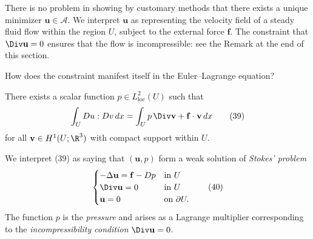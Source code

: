 There is no problem in showing by customary methods that there exists a unique minimizer $\mathbf{u} \in \mathcal{A}$. We interpret $\mathbf{u}$ as representing the velocity field of a steady fluid flow within the region $U$, subject to the external force $\mathbf{f}$. The constraint that $\Div \mathbf{u} = 0$ ensures that the flow is incompressible: see the Remark at the end of this section.

How does the constraint manifest itself in the Euler--Lagrange equation?

\begin{theorem}
\label{thm:pressure-lagrange-multiplier-stokes}
There exists a scalar function $p \in L^2_{\text{loc}}(U)$ such that
\[
\int_U Du : Dv\, dx = \int_U p\, \Div \mathbf{v} + \mathbf{f}\cdot\mathbf{v}\, dx
\tag{39}
\]
for all $\mathbf{v} \in H^1(U;\R^3)$ with compact support within $U$.
\end{theorem}

\begin{remark}
\label{rem:stokes-problem-weak-formulation}
We interpret (39) as saying that $(\mathbf{u}, p)$ form a weak solution of \textit{Stokes' problem}
\[
\begin{cases}
-\Delta \mathbf{u} = \mathbf{f} - Dp & \text{in } U \\
\Div \mathbf{u} = 0 & \text{in } U \\
\mathbf{u} = 0 & \text{on } \partial U.
\end{cases}
\tag{40}
\]
The function $p$ is the \textit{pressure} and arises as a Lagrange multiplier corresponding to the \textit{incompressibility condition} $\Div \mathbf{u} = 0$.
\end{remark}

